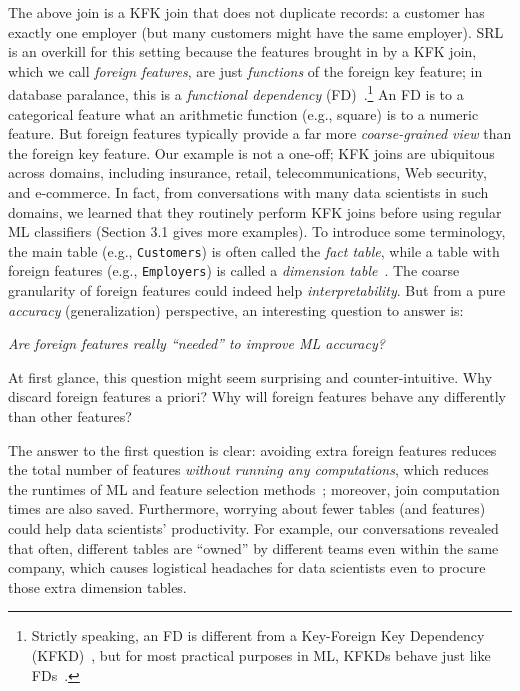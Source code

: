 \documentclass[sigconf]{acmart}
\begin{document}
The above join is a KFK join that does not duplicate records: a customer has exactly one employer (but many customers might have the same employer).
SRL is an overkill for this setting because the features brought in by a KFK join, which we call \textit{foreign features}, are just \textit{functions} of 
the foreign key feature; in database paralance, this is a \textit{functional dependency} (FD)~\cite{cowbook}.\footnote{Strictly speaking, an FD is different 
from a Key-Foreign Key Dependency (KFKD)~\cite{dbtheorybook}, but for most practical purposes in ML, KFKDs behave just like FDs~\cite{hamlet}.} 
An FD is to a categorical feature what an arithmetic function (e.g., square) is to a numeric feature. But foreign features typically provide a far more 
\textit{coarse-grained view} than the foreign key feature.
Our example is not a one-off; KFK joins are ubiquitous across domains, including insurance, retail, telecommunications, Web security, 
and e-commerce. In fact, from conversations with many data scientists in such domains, we learned that they routinely perform KFK joins before using 
regular ML classifiers (Section 3.1 gives more examples). To introduce some terminology, the main table (e.g., \texttt{Customers}) is often called the 
\textit{fact table}, while a table with foreign features (e.g., \texttt{Employers}) is called a \textit{dimension table}~\cite{cowbook}.
%
The coarse granularity of foreign features could indeed help \textit{interpretability}. But from a pure \textit{accuracy} (generalization) perspective, 
an interesting question to answer is: 

\begin{center}\textit{Are foreign features really ``needed'' to improve ML accuracy?}\end{center}

At first glance, this question might seem surprising and counter-intuitive. Why discard foreign features a priori? Why will foreign features 
behave any differently than other features? 

The answer to the first question is clear: avoiding extra foreign features reduces the total number of features \textit{without running any computations}, 
which reduces the runtimes of ML and feature selection methods~\cite{guyon}; moreover, join computation times are also saved. 
Furthermore, worrying about fewer tables (and features) could help data scientists' productivity. For example, our conversations revealed that often, different tables 
are ``owned'' by different teams even within the same company, which causes logistical headaches for data scientists even to procure those extra dimension tables.
\end{document}
